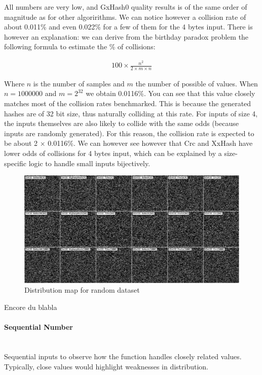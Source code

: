 \documentclass[10pt]{article}
\begin{document}
All numbers are very low, and GxHash0 quality results is of the same order of magnitude as for other algoririthms.
We can notice however a collision rate of about 0.011\% and even 0.022\% for a few of them for the 4 bytes input.
There is however an explanation: we can derive from the birthday paradox problem the following formula to
estimate the \% of collisions:

\begin{align*}
    100 \times \frac{n^2}{2 \times m \times n}
\end{align*}

Where \(n\) is the number of samples and \(m\) the number of possible of values. When \(n=1000000\) and \(m=2^32\) we obtain 0.0116\%.
You can see that this value closely matches most of the collision rates benchmarked. This is because the generated hashes are of 32 bit size,
thus naturally colliding at this rate. For inputs of size 4, the inputs themselves are also likely to collide with the same odds (because inputs are randomly generated). For this reason, the collision rate is expected to be about 2 \(\times\) 0.0116\%.
We can however see however that Crc and XxHash have lower odds of collisions for 4 bytes input, which can be explained by a size-specific logic to handle small inputs bijectively.


\begin{figure}[H]
\centering
\includegraphics[width=1\textwidth]{quality-random.png}
\caption{Distribution map for random dataset}
\label{fig:quality-random}
\end{figure}

Encore du blabla

\clearpage
\paragraph{Sequential Number}\leavevmode\\
Sequential inputs to observe how the function handles closely related values. Typically, close values would highlight weaknesses in distribution.
\end{document}
